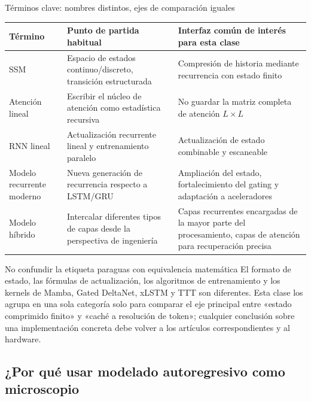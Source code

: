 
\begin{knowledgebox}{Términos clave: nombres distintos, ejes de comparación iguales}
\begin{tabularx}{\textwidth}{L{0.20\textwidth}X X}
\toprule
Término & Punto de partida habitual & Interfaz común de interés para esta clase \\
\midrule
SSM & Espacio de estados continuo/discreto, transición estructurada & Compresión de historia mediante recurrencia con estado finito \\
Atención lineal & Escribir el núcleo de atención como estadística recursiva & No guardar la matriz completa de atención $L\times L$ \\
RNN lineal & Actualización recurrente lineal y entrenamiento paralelo & Actualización de estado combinable y escaneable \\
Modelo recurrente moderno & Nueva generación de recurrencia respecto a LSTM/GRU & Ampliación del estado, fortalecimiento del gating y adaptación a aceleradores \\
Modelo híbrido & Intercalar diferentes tipos de capas desde la perspectiva de ingeniería & Capas recurrentes encargadas de la mayor parte del procesamiento, capas de atención para recuperación precisa \\
\bottomrule
\end{tabularx}
\end{knowledgebox}

\begin{warningbox}{No confundir la etiqueta paraguas con equivalencia matemática}
El formato de estado, las fórmulas de actualización, los algoritmos de entrenamiento y los kernels de Mamba, Gated DeltaNet, xLSTM y TTT son diferentes. Esta clase los agrupa en una sola categoría solo para comparar el eje principal entre «estado comprimido finito» y «caché a resolución de token»; cualquier conclusión sobre una implementación concreta debe volver a los artículos correspondientes y al hardware.
\end{warningbox}

\subsection{¿Por qué usar modelado autoregresivo como microscopio}

